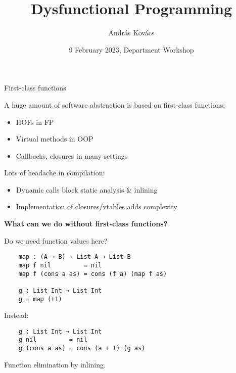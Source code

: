 \documentclass[dvipsnames,aspectratio=169]{beamer}
\title{Dysfunctional Programming}
\author{András Kovács}
\institute{
  {Eötvös Loránd University, Dept. of Programming Languages and Compilers}
}
\date{9 February 2023, Department Workshop}
\theoremstyle{remark}
\begin{document}
\frame{\titlepage}


\begin{frame}{First-class functions}

A huge amount of software abstraction is based on first-class functions:
\begin{itemize}
\item HOFs in FP
\item Virtual methods in OOP
\item Callbacks, closures in many settings
\end{itemize}
\vspace{1em}
\pause

Lots of headache in compilation:
\begin{itemize}
\item Dynamic calls block static analysis \& inlining
\item Implementation of closures/vtables adds complexity
\end{itemize}
\vspace{1em}
\pause

\begin{block}{}
\textbf{What can we do without first-class functions?}
\end{block}

\end{frame}


\begin{frame}[fragile]{}

Do we need function values here?

\begin{exampleblock}{}
\begin{verbatim}
    map : (A → B) → List A → List B
    map f nil         = nil
    map f (cons a as) = cons (f a) (map f as)

    g : List Int → List Int
    g = map (+1)
\end{verbatim}
\end{exampleblock}
\pause

Instead:

\begin{exampleblock}{}
\begin{verbatim}
    g : List Int → List Int
    g nil         = nil
    g (cons a as) = cons (a + 1) (g as)
\end{verbatim}
\end{exampleblock}
\pause
Function elimination by inlining.

\end{frame}
\end{document}
